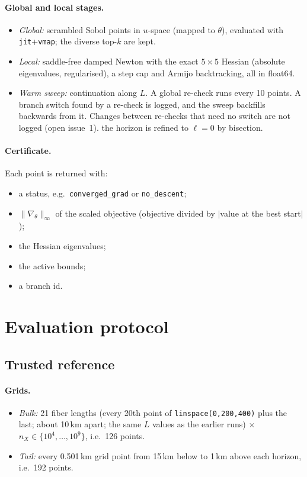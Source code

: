 \documentclass[11pt,a4paper]{article}
\begin{document}
\paragraph{Global and local stages.}
\begin{itemize}
\item \emph{Global:} scrambled Sobol points in $u$-space (mapped to $\theta$), evaluated with \texttt{jit}+\texttt{vmap}; the
  diverse top-$k$ are kept.
\item \emph{Local:} saddle-free damped Newton with the exact $5\times5$ Hessian (absolute eigenvalues,
  regularised), a step cap and Armijo backtracking, all in float64.
\item \emph{Warm sweep:} continuation along $L$. A global re-check runs every 10 points. A branch switch found by a re-check is
  logged, and the sweep backfills backwards from it. Changes between re-checks that need no switch are not
  logged (open issue~1). the horizon is refined to $\ell=0$ by bisection.
\end{itemize}

\paragraph{Certificate.} Each point is returned with:
\begin{itemize}
\item a status, e.g.\ \texttt{converged\_grad} or \texttt{no\_descent};
\item $\|\nabla_\theta\|_\infty$ of the scaled objective (objective divided by $|$value at the best start$|$);
\item the Hessian eigenvalues;
\item the active bounds;
\item a branch id.
\end{itemize}

\section{Evaluation protocol}\label{sec:protocol}
\subsection{Trusted reference}
\paragraph{Grids.}
\begin{itemize}
\item \emph{Bulk:} 21 fiber lengths (every 20th point of \texttt{linspace(0,200,400)} plus the last; about 10\,km
  apart; the same $L$ values as the earlier runs) $\times$ $n_X\in\{10^4,\dots,10^9\}$, i.e.\ 126 points.
\item \emph{Tail:} every 0.501\,km grid point from 15\,km below to 1\,km above each horizon, i.e.\ 192 points.
\end{itemize}
\end{document}
